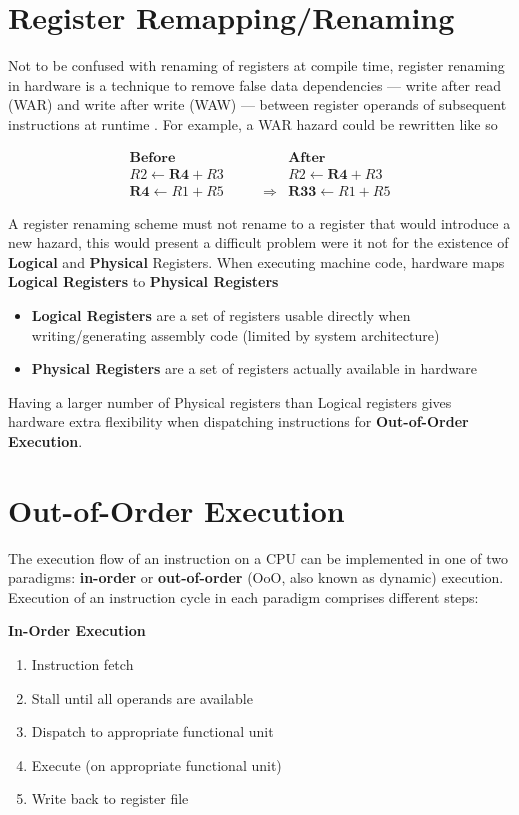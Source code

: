 \documentclass[12pt]{report}
\begin{document}
\section{Register Remapping/Renaming}
\label{sec:orgbf8551b}
Not to be confused with renaming of registers at compile time, register
renaming in hardware is a technique to remove false data dependencies ---
write after read (WAR) and write after write (WAW) --- between register
operands of subsequent instructions at runtime \parencite{sima2000design}.
For example, a WAR hazard could be rewritten like so

\begin{align*}
\textbf{Before}                   & \qquad &                 \textbf{After} \\
R2 \leftarrow \textbf{R4} + R3    & \qquad &                 R2 \leftarrow \textbf{R4} + R3 \\
\textbf{R4} \leftarrow R1 + R5    & \qquad \Longrightarrow & \textbf{R33} \leftarrow R1 + R5
\end{align*}

A register renaming scheme must not rename to a register that would introduce
a new hazard, this would present a difficult problem were it not for the
existence of \textbf{Logical} and \textbf{Physical} Registers. When executing machine code,
hardware maps \textbf{Logical Registers} to \textbf{Physical Registers}
\begin{itemize}
\item \textbf{Logical Registers} are a set of registers usable directly when
writing/generating assembly code (limited by system architecture)
\item \textbf{Physical Registers} are a set of registers actually available in hardware
\end{itemize}
Having a larger number of Physical registers than Logical registers gives
hardware extra flexibility when dispatching instructions for \textbf{Out-of-Order Execution}.

\section{Out-of-Order Execution}
\label{sec:orge185005}

The execution flow of an instruction on a CPU can be implemented in one of
two paradigms: \textbf{in-order} or \textbf{out-of-order} (OoO, also known as dynamic)
execution. Execution of an instruction cycle in each paradigm comprises
different steps:

\noindent
\textbf{In-Order Execution}
\begin{enumerate}
\item Instruction fetch
\item Stall until all operands are available
\item Dispatch to appropriate functional unit
\item Execute (on appropriate functional unit)
\item Write back to register file
\end{enumerate}
\end{document}
